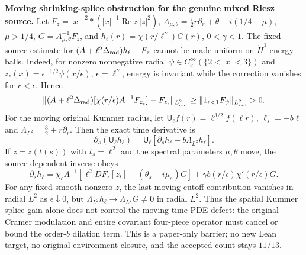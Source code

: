 
\par\medskip
\noindent\textbf{Moving shrinking-splice obstruction for the genuine mixed Riesz source.}
Let $F_z=|x|^{-2}*(|x|^{-1}\operatorname{Re}z\,|z|^2)$,
$A_{\mu,\theta}=\frac i2r\partial_r+\theta+i(1/4-\mu)$,
$\mu>1/4$, $G=A_{\mu,\theta}^{-1}F_z$, and
$h_\ell(r)=\chi(r/\ell^\gamma)G(r)$, $0<\gamma<1$.
The fixed-source estimate for
$(A+\ell^2\Delta_{\rm rad})h_\ell-F_z$ cannot be made uniform
on $\dot H^1$ energy balls. Indeed, for nonzero nonnegative
radial $\psi\in C_c^\infty(\{2<|x|<3\})$ and
$z_\epsilon(x)=\epsilon^{-1/2}\psi(x/\epsilon)$,
$\epsilon=\ell^\gamma$, energy is invariant while the correction
vanishes for $r<\epsilon$. Hence
\[
 \|(A+\ell^2\Delta_{\rm rad})[
    \chi(r/\epsilon)A^{-1}F_{z_\epsilon}]-F_{z_\epsilon}\|_{L^2_{\rm rad}}
 \ge \|1_{r<1}F_\psi\|_{L^2_{\rm rad}}>0 .
\]
For the moving original Kummer radius, let
$\mathsf U_\ell f(r)=\ell^{3/2}f(\ell r)$,
$\ell_s=-b\ell$ and $\Lambda_{L^2}=\frac32+r\partial_r$.
Then the exact time derivative is
\[
 \partial_s(\mathsf U_\ell h_\ell)
   =\mathsf U_\ell[\partial_s h_\ell-b\Lambda_{L^2}h_\ell].
\]
If $z=z(t(s))$ with $t_s=\ell^2$ and the spectral parameters
$\mu,\theta$ move, the source-dependent inverse obeys
\[
 \partial_s h_\ell
 =\chi_\epsilon A^{-1}
   [\ell^2 D F_z[z_t]-(\theta_s-i\mu_s)G]
 +\gamma b(r/\epsilon)\chi'(r/\epsilon)G .
\]
For any fixed smooth nonzero $z$, the last moving-cutoff contribution
vanishes in radial $L^2$ as $\epsilon\downarrow0$, but
$\Lambda_{L^2}h_\ell\to\Lambda_{L^2}G\ne0$ in radial $L^2$.
Thus the spatial Kummer splice gain alone does not control the
moving-time PDE defect: the original Cramer modulation and entire
covariant four-piece operator must cancel or bound the order-$b$
dilation term. This is a paper-only barrier; no new Lean target,
no original environment closure, and the accepted count stays $11/13$.
